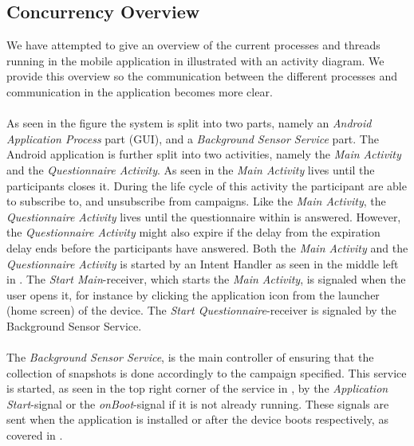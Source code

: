 \subsection{Concurrency Overview}
We have attempted to give an overview of the current processes and threads running in the mobile application in  illustrated with an activity diagram. We provide this overview so the communication between the different processes and communication in the application becomes more clear.
\\\\
As seen in the figure the system is split into two parts, namely an \emph{Android Application Process} part (GUI), and a \emph{Background Sensor Service} part. The Android application is further split into two activities, namely the \emph{Main Activity} and the \emph{Questionnaire Activity}. As seen in  the \emph{Main Activity} lives until the participants closes it. During the life cycle of this activity the participant are able to subscribe to, and unsubscribe from campaigns. Like the \emph{Main Activity}, the \emph{Questionnaire Activity} lives until the questionnaire within is answered. However, the \emph{Questionnaire Activity} might also expire if the delay from the expiration delay ends before the participants have answered. Both the \emph{Main Activity} and the \emph{Questionnaire Activity} is started by an Intent Handler as seen in the middle left in . The \emph{Start Main}-receiver, which starts the \emph{Main Activity}, is signaled when the user opens it, for instance by clicking the application icon from the launcher (home screen) of the device. The \emph{Start Questionnaire}-receiver is signaled by the Background Sensor Service.
\\\\
The \emph{Background Sensor Service}, is the main controller of ensuring that the collection of snapshots is done accordingly to the campaign specified. This service is started, as seen in the top right corner of the service in , by the \emph{Application Start}-signal or the \emph{onBoot}-signal if it is not already running. These signals are sent when the application is installed or after the device boots respectively, as covered in . 

